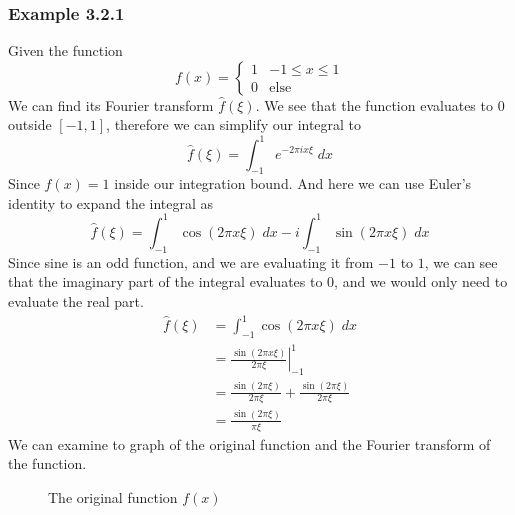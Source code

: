 \documentclass[12pt]{book}
\newcommand{\sqbkt}[1]{\left[ #1 \right]}
\newcommand{\paren}[1]{\left( #1 \right)}
\begin{document}
\subsubsection{Example 3.2.1}
Given the function
\[
f(x) = 
\begin{cases}
    1  &-1 \leq x \leq 1\\
    0  &\text{else}
\end{cases}
\]
We can find its Fourier transform $\hat{f}(\xi)$. We see that the function evaluates to $0$ outside $\sqbkt{-1,1}$, therefore we can simplify our integral to
\[
\hat{f}(\xi) = \int_{-1}^{1}e^{-2\pi i x \xi}\;dx
\]
Since $f(x) = 1$ inside our integration bound. And here we can use Euler's identity to expand the integral as
\[
\hat{f}(\xi) = \int_{-1}^{1} \cos\paren{2\pi x \xi}\; dx - i\int_{-1}^{1}\sin\paren{2\pi x \xi} \;dx
\]
Since sine is an odd function, and we are evaluating it from $-1$ to $1$, we can see that the imaginary part of the integral evaluates to $0$, and we would only need to evaluate the real part.
\begin{align*}
    \hat{f}(\xi)&= \int_{-1}^{1} \cos\paren{2\pi x \xi}\; dx\\
                &= \left. \frac{\sin\paren{2\pi x \xi }}{2\pi \xi} \right|_{-1}^{1}\\
                &= \frac{\sin\paren{2\pi \xi}}{2 \pi \xi} + \frac{\sin \paren{2\pi \xi}}{2\pi \xi}\\
                &= \frac{\sin\paren{2 \pi \xi}}{\pi \xi}
\end{align*}
We can examine to graph of the original function and the Fourier transform of the function. 
\begin{figure}[!h]
    \centering
    \caption{The original function \( f(x) \)}
    \label{fig:3.1}
\end{figure}
\end{document}
